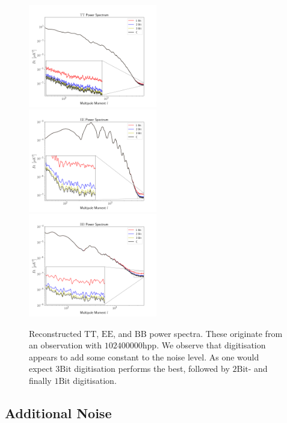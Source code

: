 \documentclass[apj]{emulateapj}
\begin{document}
\begin{figure}[htb]\centering
\includegraphics[width=0.5\textwidth,clip]{Plots/ttzoom.png}
\includegraphics[width=0.5\textwidth,clip]{Plots/eezoom.png}
\includegraphics[width=0.5\textwidth,clip]{Plots/bbzoom.png}
  \caption[Current ]{
   Reconstructed $\mathrm{TT}$, $\mathrm{EE}$, and $\mathrm{BB}$ power spectra. These originate from an observation with $102400000 \mathrm{hpp}$. We observe that digitisation appears to add some constant to the noise level. As one would expect $3 \mathrm{Bit}$ digitisation performs the best, followed by $2 \mathrm{Bit}$- and finally $1 \mathrm{Bit}$ digitisation.
\label{fig:powspeczoom}
}
\end{figure}


\subsection{Additional Noise}
\label{subsec:additionalnoise}
\end{document}
